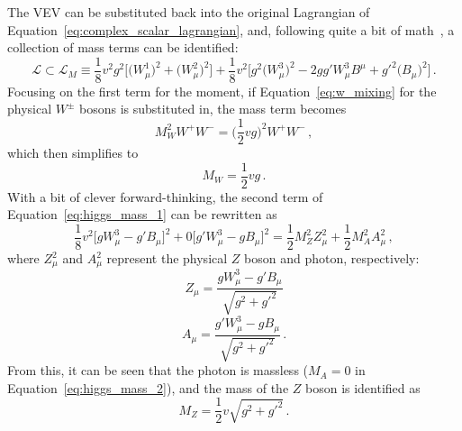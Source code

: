 The VEV can be substituted back into the original Lagrangian of Equation~\ref{eq:complex_scalar_lagrangian}, and, following quite a bit of math~\cite{1984.halzen-martin}, a collection of mass terms can be identified:
\begin{equation}
  \mathcal{L} \subset \mathcal{L}_M \equiv \frac{1}{8}v^{2}g^{2}\bigg[\big(W_{\mu}^1\big)^2 + \big(W_{\mu}^2\big)^2\bigg] + \frac{1}{8}v^2\bigg[g^{2}\big(W_{\mu}^3\big)^2 - 2gg'W_{\mu}^{3}B^{\mu} + g'^{2}\big(B_{\mu}\big)^{2}\bigg]\,.
  \label{eq:higgs_mass_1}
\end{equation}
Focusing on the first term for the moment, if Equation~\ref{eq:w_mixing} for the physical $W^\pm$ bosons is substituted in, the mass term becomes
\begin{equation}
  M_W^{2}W^{+}W^{-} = \bigg(\frac{1}{2}vg\bigg)^{2}W^{+}W^{-}\,,
\end{equation}
which then simplifies to
\begin{equation}
  M_W = \frac{1}{2}vg\,.
\end{equation}
With a bit of clever forward-thinking, the second term of Equation~\ref{eq:higgs_mass_1} can be rewritten as
\begin{equation}
  \frac{1}{8}v^{2}\bigg[gW_{\mu}^{3} - g'B_{\mu}\bigg]^2 + 0\bigg[g'W_{\mu}^{3} - gB_{\mu}\bigg]^2 =  \frac{1}{2}M_{Z}^{2}Z_{\mu}^{2} + \frac{1}{2}M_{A}^{2}A_{\mu}^{2}\,,
  \label{eq:higgs_mass_2}
\end{equation}
where $Z_{\mu}^{2}$ and $A_{\mu}^2$ represent the physical $Z$ boson and photon, respectively:
\begin{equation}
 Z_{\mu} = \frac{gW_{\mu}^{3} - g'B_{\mu}}{\sqrt{g^2+g'^2}}
  \label{eq:higgs_z}
\end{equation}
\begin{equation}
  A_{\mu} = \frac{g'W_{\mu}^{3} - gB_{\mu}}{\sqrt{g^2+g'^2}}\,.
  \label{eq:higgs_a}
\end{equation}
From this, it can be seen that the photon is massless ($M_A = 0$ in Equation~\ref{eq:higgs_mass_2}), and the mass of the $Z$ boson is identified as
\begin{equation}
  M_Z = \frac{1}{2}v\sqrt{g^2+g'^2}\,.
\end{equation}

